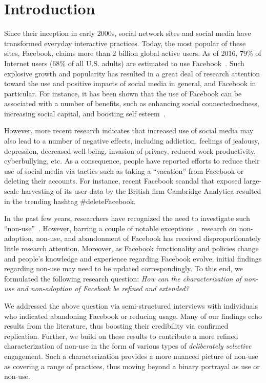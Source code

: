 \section{Introduction}
\label{sec:introduction}
Since their inception in early 2000s, social network sites and social media have transformed everyday interactive practices. Today, the most popular of these sites, Facebook, claims more than 2 billion global active users. As of 2016, 79\% of Internet users (68\% of all U.S. adults) are estimated to use Facebook~\cite{greenwood2016social}. Such explosive growth and popularity has resulted in a great deal of research attention toward the use and positive impacts of social media in general, and Facebook in particular. For instance, it has been shown that the use of Facebook can be associated with a number of benefits, such as enhancing social connectednedness, increasing social capital, and boosting self esteem~\cite{koroleva2011its,ellison2007benefits}.

However, more recent research indicates that increased use of social media may also lead to a number of negative effects, including addiction, feelings of jealousy, depression, decreased well-being, invasion of privacy, reduced work productivity, cyberbullying, etc. As a consequence, people have reported efforts to reduce their use of social media via tactics such as taking a ``vacation'' from Facebook or deleting their accounts. For instance, recent Facebook scandal that exposed large-scale harvesting of its user data by the British firm Cambridge Analytica resulted in the trending hashtag \#deleteFacebook.

In the past few years, researchers have recognized the need to investigate such ``non-use''~\cite{baumer2014refusing}. However, barring a couple of notable exceptions~\cite{baumer2013limiting,lampe2013users}, research on non-adoption, non-use, and abandonment of Facebook has received disproportionately little research attention. Moreover, as Facebook functionality and policies change and people's knowledge and experience regarding Facebook evolve, initial findings regarding non-use may need to be updated correspondingly. To this end, we formulated the following research question: \emph{How can the characterization of non-use and non-adoption of Facebook be refined and extended?}

We addressed the above question via semi-structured interviews with individuals who indicated abandoning Facebook or reducing usage. Many of our findings echo results from the literature, thus boosting their credibility via confirmed replication. Further, we build on these results to contribute a more refined characterization of non-use in the form of various types of \emph{deliberately selective} engagement. Such a characterization provides a more nuanced picture of non-use as covering a range of practices, thus moving beyond a binary portrayal as use or non-use.

